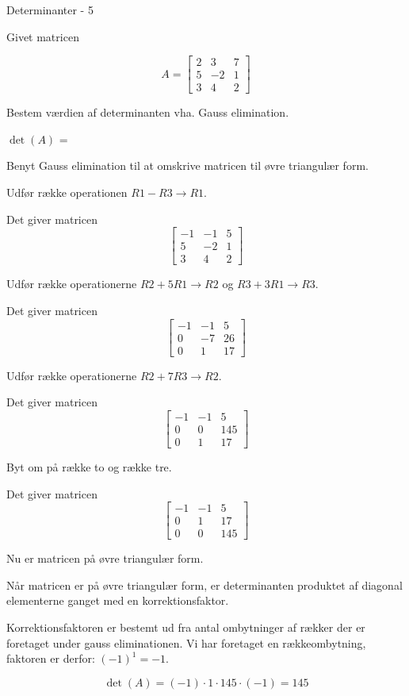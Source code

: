 \documentclass{article}
\begin{document}
\begin{exercise}{Determinanter - 5}
	
Givet matricen
	
\[
A = \left[\begin{array}{rrr}
2 & 3 & 7 \\ 
5 & -2 & 1 \\
3 & 4 & 2
\end{array} \right]
\]
	
Bestem værdien af determinanten vha. Gauss elimination.

$\det(A)$ = 

\hint
Benyt Gauss elimination til at omskrive matricen til 
øvre triangulær form.

\hint
Udfør række operationen
$R1 - R3 \to R1$.

\hint
Det giver matricen
\[
\left[\begin{array}{rrr}
-1 & -1 & 5 \\ 
5 & -2 & 1 \\
3 & 4 & 2
\end{array} \right]
\]
	
\hint
Udfør række operationerne
$R2 + 5R1 \to R2$ og $R3 + 3R1 \to R3$.

\hint
Det giver matricen
\[
\left[\begin{array}{rrr}
-1 & -1 & 5 \\ 
0 & -7 & 26 \\
0 & 1 & 17
\end{array} \right]
\]
	
\hint
Udfør række operationerne
$R2 + 7R3 \to R2$.

\hint
Det giver matricen
\[
\left[\begin{array}{rrr}
-1 & -1 & 5 \\ 
0 & 0 & 145 \\
0 & 1 & 17
\end{array} \right]
\]
	
\hint
Byt om på række to og række tre.

\hint
Det giver matricen
\[
\left[\begin{array}{rrr}
-1 & -1 & 5 \\ 
0 & 1 & 17 \\
0 & 0 & 145
\end{array} \right]
\]

\hint
Nu er matricen på øvre triangulær form.

\hint
Når matricen er på øvre triangulær form, er determinanten 
produktet af diagonal elementerne ganget med en korrektionsfaktor.

\hint
Korrektionsfaktoren er bestemt ud fra antal ombytninger af rækker
der er foretaget under gauss eliminationen.
Vi har foretaget en rækkeombytning, faktoren er derfor: $(-1)^1 = -1$.

\hint
\[
\det(A) = (-1) \cdot 1 \cdot 145 \cdot (-1) = 145
\]
	
\end{exercise}
\end{document}
